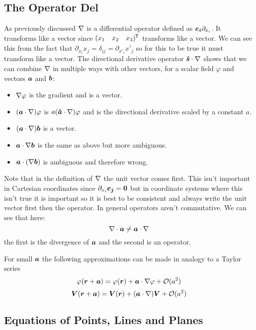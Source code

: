 \documentclass{article}
\newcommand{\pdvx}[1]{\partial_{x_{#1}}}
\begin{document}
    \subsection{The Operator Del}
    As previously discussed \(\nabla\) is a differential operator defined as \(\ve i\pdvx i\).
    It transforms like a vector since \((\begin{matrix} x_1 & x_2 & x_3\end{matrix})^{\mkern-1.5mu\mathsf{T}}\) transforms like a vector.
    We can see this from the fact that \(\pdvx i x_j = \delta_{ij} = \partial_{x'_i}x'_j\) so for this to be true it must transform like a vector.
    The directional derivative operator \(\bm{\hat{s}}\cdot\nabla\) shows that we can combine \(\nabla\) in multiple ways with other vectors, for a scalar field \(\varphi\) and vectors \(\bm{a}\) and \(\bm{b}\):
    \begin{itemize}
        \item \(\nabla\varphi\) is the gradient and is a vector.
        \item \((\bm{a}\cdot\nabla)\varphi\) is \(a(\bm{\hat{a}}\cdot\nabla)\varphi\) and is the directional derivative scaled by a constant \(a\).
        \item \((\bm{a}\cdot\nabla)\bm{b}\) is a vector.
        \item \(\bm{a}\cdot\nabla\bm{b}\) is the same as above but more ambiguous.
        \item \(\bm{a}\cdot(\nabla\bm{b})\) is ambiguous and therefore wrong.
    \end{itemize}
    Note that in the definition of \(\nabla\) the unit vector comes first.
    This isn't important in Cartesian coordinates since \(\pdvx i\ve j = \vv 0\) but in coordinate systems where this isn't true it is important so it is best to be consistent and always write the unit vector first then the operator.
    In general operators aren't commutative.
    We can see that here:
    \[\nabla\cdot\bm{a} \ne \bm{a}\cdot\nabla\]
    the first is the divergence of \(\bm{a}\) and the second is an operator.
    
    For small \(\bm{a}\) the following approximations can be made in analogy to a Taylor series
    \[\varphi(\bm{r} + \bm{a}) = \varphi(\bm{r}) + \bm{a}\cdot\nabla\varphi + \mathcal{O}(a^2)\]
    \[\bm{V}(\bm{r} + \bm{a}) = \bm{V}(\bm{r}) + (\bm{a}\cdot\nabla)\bm{V} + \mathcal{O}(a^2)\]
    
    \subsection{Equations of Points, Lines and Planes}
\end{document}
